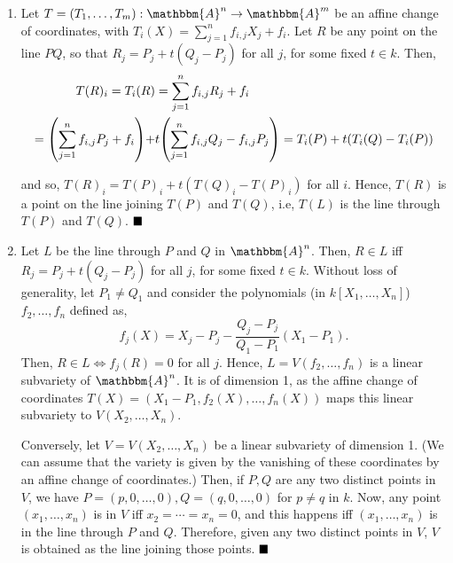 \documentclass[12pt]{article}
\begin{document}
\begin{enumerate}[label = (\alph*)]
    \item Let \( T = (T_1, \dots, T_m): \mathbbm{A}^n \to \mathbbm{A}^m \) be an affine change of coordinates, with \( T_i(X) = \sum_{j=1}^{n}f_{i,j}X_j + f_i \). Let \( R \) be any point on the line \( PQ \), so that \( R_j = P_j + t(Q_j-P_j) \) for all \( j \), for some fixed \( t \in k \). Then,
          \begin{align*}
            T(R)_i = T_i(R) &= \sum_{j=1}^{n}f_{i,j}R_j + f_i \\= \qty(\sum_{j=1}^{n}f_{i,j}P_j + f_i) + &t \qty(\sum_{j=1}^{n}f_{i,j}Q_j - f_{i,j}P_j) = T_i(P) + t(T_i(Q)-T_i(P))
          \end{align*}
            
          
          and so, \( T(R)_i = T(P)_i + t(T(Q)_i-T(P)_i) \) for all \( i \). Hence, \( T(R) \) is a point on the line joining \( T(P) \) and \( T(Q) \), i.e, \( T(L) \) is the line through \( T(P) \) and \( T(Q) \). \(\hfill \blacksquare\)
          \smallskip

    \item Let \( L \) be the line through \( P \) and \( Q \) in \( \mathbbm{A}^n \). Then, \( R \in L \) iff \( R_j = P_j + t(Q_j-P_j) \) for all \( j \), for some fixed \( t \in k \). Without loss of generality, let \( P_1 \neq Q_1 \) and consider the polynomials (in \( k[X_1, \dots, X_n] \)) \( f_2, \dots, f_n \) defined as,
          \[
              f_j(X) = X_j - P_j - \frac{Q_j-P_j}{Q_1-P_1}(X_1-P_1).
          \]
          Then, \( R \in L \iff f_j(R) = 0 \) for all \( j \). Hence, \( L = V(f_2, \dots, f_n) \) is a linear subvariety of \( \mathbbm{A}^n \). It is of dimension 1, as the affine change of coordinates \( T(X) = (X_1-P_1, f_2(X), \dots, f_n(X)) \) maps this linear subvariety to \( V(X_2, \dots, X_n) \).
          \smallskip

          Conversely, let \( V = V(X_2, \dots, X_n) \) be a linear subvariety of dimension 1. (We can assume that the variety is given by the vanishing of these coordinates by an affine change of coordinates.) Then, if \( P,Q \) are any two distinct points in \( V \), we have \( P = (p, 0, \dots, 0), Q = (q,0,\dots,0) \) for \( p \neq q \) in \( k \). Now, any point \( (x_1, \dots, x_n) \) is in \( V \) iff \( x_2 = \cdots = x_n = 0 \), and this happens iff \( (x_1, \dots, x_n) \) is in the line through \( P \) and \( Q \). Therefore, given any two distinct points in \( V \), \( V \) is obtained as the line joining those points. \(\hfill \blacksquare\)
          \smallskip


\end{enumerate}
\end{document}
